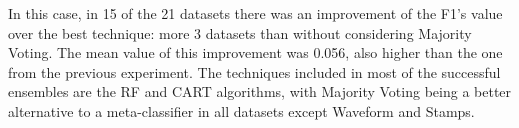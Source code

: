 In this case, in 15 of the 21 datasets there was an improvement of the F1's value over the best technique: more 3 datasets than without considering Majority Voting.
The mean value of this improvement was 0.056, also higher than the one from the previous experiment. The techniques included in most of the successful ensembles are the RF and CART algorithms, with Majority Voting being a better alternative to a meta-classifier in all datasets except Waveform and Stamps.


